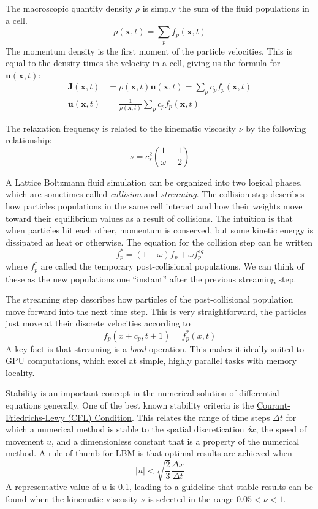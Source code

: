 \documentclass[11pt]{article} %
\renewcommand{\vec}[1]{\mathbf{#1}}
\begin{document}
The macroscopic quantity density $\rho$ is simply the sum of the fluid populations in a cell.
$$\rho(\vec{x}, t) = \sum_{p}f_p(\vec{x}, t)$$
The momentum density is the first moment of the particle velocities.  
This is equal to the density times the velocity in a cell, giving us the formula for $\vec{u}(\vec{x}, t)$:
\begin{align*}
\vec{J}(\vec{x}, t) &= \rho(\vec{x}, t) \vec{u}(\vec{x}, t) = \sum_{p}c_p f_p(\vec{x}, t) \\
\vec{u}(\vec{x}, t) &= \frac{1}{\rho(\vec{x}, t)} \sum_{p}c_p f_p(\vec{x}, t)
\end{align*}

The relaxation frequency is related to the kinematic viscosity $\nu$ by the following relationship:
$$ \nu = c_s^2 \left(\frac{1}{\omega} - \frac{1}{2}\right)$$

A Lattice Boltzmann fluid simulation can be organized into two logical phases, 
which are sometimes called \textit{collision} and \textit{streaming}.
The collision step describes how particles populations in the same cell interact and 
how their weights move toward their equilibrium values as a result of collisions.
The intuition is that when particles hit each other, momentum is conserved, 
but some kinetic energy is dissipated as heat or otherwise.
The equation for the collision step can be written
$$f_p^* = (1-\omega)f_p + \omega f_p^{eq}$$
where $f_p^*$ are called the temporary post-collisional populations.
We can think of these as the new populations one ``instant'' after the previous streaming step.

The streaming step describes how particles of the post-collisional population move forward into the next time step.  
This is very straightforward, the particles just move at their discrete velocities according to
$$f_p(x + c_p, t+ 1) = f_p^*(x, t)$$
A key fact is that streaming is a \textit{local} operation.  
This makes it ideally suited to GPU computations, which excel at simple, highly parallel tasks with memory locality.

Stability is an important concept in the numerical solution of differential equations generally.
One of the best known stability criteria is the 
\href{https://en.wikipedia.org/wiki/Courant%E2%80%93Friedrichs%E2%80%93Lewy_condition}{Courant-Friedrichs-Lewy (CFL) Condition}.
This relates the range of time steps $\Delta t$ for which a numerical method is stable to the spatial discretication $\delta x$,
the speed of movement $u$, and a dimensionless constant that is a property of the numerical method.
A rule of thumb for LBM is that optimal results are achieved when 
$$|u| < \sqrt{\frac{2}{3}} \frac{\Delta x}{\Delta t}$$
A representative value of $u$ is 0.1, leading to a guideline that stable results can be found when the
kinematic viscosity $\nu$ is selected in the range $0.05 < \nu < 1$.
\end{document}
